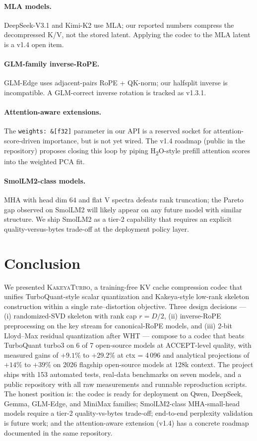 \documentclass[11pt,a4paper]{article}
\theoremstyle{definition}
\theoremstyle{plain}
\begin{document}
\paragraph{MLA models.} DeepSeek-V3.1 and Kimi-K2 use MLA; our reported numbers compress the decompressed K/V, not the stored latent. Applying the codec to the MLA latent is a v1.4 open item.

\paragraph{GLM-family inverse-RoPE.} GLM-Edge uses adjacent-pairs RoPE + QK-norm; our halfsplit inverse is incompatible. A GLM-correct inverse rotation is tracked as v1.3.1.

\paragraph{Attention-aware extensions.} The \texttt{weights: \&[f32]} parameter in our API is a reserved socket for attention-score-driven importance, but is not yet wired. The v1.4 roadmap (public in the repository) proposes closing this loop by piping H\textsubscript{2}O-style prefill attention scores into the weighted PCA fit.

\paragraph{SmolLM2-class models.} MHA with head dim $64$ and flat V spectra defeats rank truncation; the Pareto gap observed on SmolLM2 will likely appear on any future model with similar structure. We ship SmolLM2 as a tier-2 capability that requires an explicit quality-versus-bytes trade-off at the deployment policy layer.

\section{Conclusion}
\label{sec:conclusion}

We presented \textsc{KakeyaTurbo}, a training-free KV cache compression codec that unifies TurboQuant-style scalar quantization and Kakeya-style low-rank skeleton construction within a single rate--distortion objective. Three design decisions --- (i) randomized-SVD skeleton with rank cap $r = D/2$, (ii) inverse-RoPE preprocessing on the key stream for canonical-RoPE models, and (iii) 2-bit Lloyd--Max residual quantization after WHT --- compose to a codec that beats TurboQuant turbo3 on 6 of 7 open-source models at ACCEPT-level quality, with measured gains of $+9.1\%$ to $+29.2\%$ at ctx = 4\,096 and analytical projections of $+14\%$ to $+39\%$ on 2026 flagship open-source models at 128k context. The project ships with 153 automated tests, real-data benchmarks on seven models, and a public repository with all raw measurements and runnable reproduction scripts. The honest position is: the codec is ready for deployment on Qwen, DeepSeek, Gemma, GLM-Edge, and MiniMax families; SmolLM2-class MHA-small-head models require a tier-2 quality-vs-bytes trade-off; end-to-end perplexity validation is future work; and the attention-aware extension (v1.4) has a concrete roadmap documented in the same repository.
\end{document}
